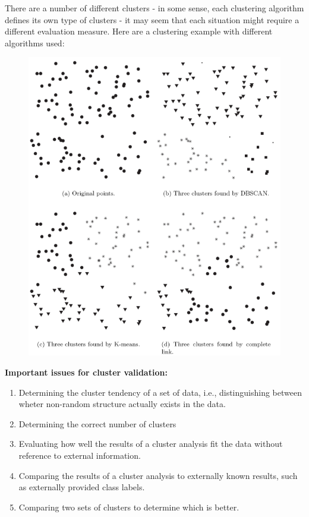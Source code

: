 		There are a number of different clusters - in some sense, each clustering 
		algorithm defines its own type of clusters - it may seem that each situation 
		might require a different evaluation measure. Here are a clustering example with
		different algorithms used:

		\begin{figure}[H]
			\centering
			\includegraphics[scale=0.4]{pics/threeclusters.png}
		\end{figure}

		{\bf Important issues for cluster validation:}
		\begin{enumerate}
			\item Determining the cluster tendency of a set of data, i.e., distinguishing
			between wheter non-random structure actually exists in the data.
			\item Determining the correct number of clusters
			\item Evaluating how well the results of a cluster analysis fit the data
			without reference to external information.
			\item Comparing the results of a cluster analysis to externally known results,
			such as externally provided class labels.
			\item Comparing two sets of clusters to determine which is better. 
		\end{enumerate}

